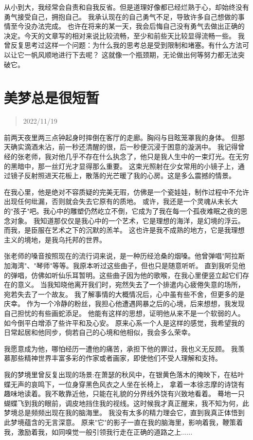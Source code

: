 \documentclass[cn,12pt]{elegantbook}
\begin{document}
从小到大，我经常会自责和自我反省。但是道理好像都已经烂熟于心，却始终没有勇气接受自己，拥抱自己。
我承认现在的自己勇气不足，导致许多自己想做的事情至今没办法完成。
也许在将来的某一天，我会后悔自己没有勇气去做出正确的决定。今天的文章写的相对来说比较流畅，至少和前些天比较显得流畅一些。
我曾反复思考过这样一个问题：为什么我的思考总是受到限制和堵塞。有什么方法可以让它一帆风顺地进行下去呢？
这就像一个瓶颈期，无论做出何等努力都无法突破它。

\newpage
\section{美梦总是很短暂}
\begin{quotation}
  2022/11/19
\end{quotation}

前两天夜里两三点钟起身时摔倒在客厅的走廊。胸闷与目眩笼罩我的身体。
但那天确实滴酒未沾，前一秒还清醒的很，后一秒便沉浸于困意的漩涡中。
我记得曾经的张老师，我对他几乎不存在什么执念了，他只是我人生中的一束灯光。在无穷的黑暗中，那一丝灯光才显得那么重要。
这束光照射在少女常用的小镜子上，通过镜子反射照进天花板上，散落的光芒暖了我的心房。这是多么震撼的情景。

在我心里，他是绝对不容质疑的完美无瑕，仿佛是一个瓷娃娃，制作过程中不允许出现任何纰漏，否则就会失去它原有的质地。
或许，我还是一个灵魂从未长大的"孩子"吧。我心中的雕塑仍然屹立不倒，它成为了我在每一个孤夜难眠之夜的思念对象。
我知道那仅仅是我心中的一个艺术，它是理想的海洋，是幻境的浮云。而我，是臣服在艺术之下的沉默的羔羊。
这也许是我不成熟的地方，它是我理想主义的境地，是我乌托邦的世界。

张老师的嗓音按照现在的流行词来说，是一种历经沧桑的烟嗓。他曾弹唱"阿拉斯加海湾"、"琴师"等等。我原本听过这些曲子，但也只是随意听听。
直到我听见他的弹唱，仿佛如听仙乐耳暂明。这些曲子因为他的歌喉，在我心里便竖立起它们存在的意义。
当我知晓他离开我们时，宛然失去了一个排遣内心疲倦失意的场所，宛若失去了一个故友。
我了解事情的大概情况后，心中虽有些不舍，但更多的是庆幸。
作为一个冷静的粉丝，我担心他遭遇网暴之后的心境，后来想想，我发现自己担忧的有些画蛇添足。
他能有这样的思想，证明他从来不是一个软弱的人。如今倒平白增添了些许平和及心安。
原来心系一个人是这样的感觉，我希望我的日常起居和他同步，倘若自己的心境和他相似，我会多么荣幸。

我愿意成为他，哪怕经历一遭他的痛苦，承担下他的罪过，我也义无反顾。
我羡慕那些精神世界丰富多彩的作家或者画家，即使他们不受人理解和支持。

我的梦境里曾反复出现的场景:在萧瑟的秋风中，在银黄色落木的掩映下，在枯叶蝶无声的哀鸣下，一位身穿黑色风衣之人坐在长椅上，
拿着一本徐志摩的诗饶有趣味地读着。我不敢靠近他，只能在礼貌的分界线外饶有兴致地看着。
蓦地一只蝴蝶飞到我的眼前，调皮地挡住我的视线。这时候我才真正醒来，我不知为何，此梦境总是频频出现在我的脑海里。
我没有太多的精力理会它，直到我真正体悟到此梦境蕴含的无言深意。
原来"它"的影子一直在我的脑海里，影响着我，鞭策着我，激励着我，如同嗅觉一般引领我行走在正确的道路之上......
\end{document}
